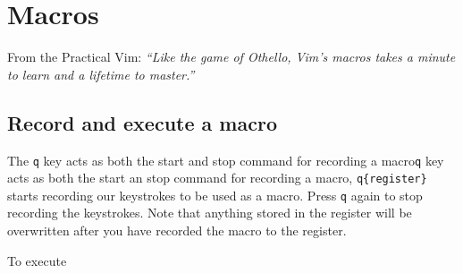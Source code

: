 \chapter{Macros}

From the Practical Vim: \textit{``Like the game of Othello, Vim's macros takes a minute to learn and a lifetime to master.''}

\section{Record and execute a macro}

The \verb|q| key acts as both the start and stop command for recording a macro\verb|q| key acts as both the start an stop command for recording a macro,
\verb|q{register}| starts recording our keystrokes to be used as a macro.
Press \verb|q| again to stop recording the keystrokes.
Note that anything stored in the register will be overwritten after you have recorded the macro to the register.

To execute 


